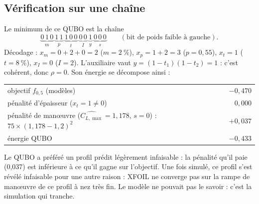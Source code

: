 \subsection{Vérification sur une chaîne}
Le minimum de ce QUBO est la chaîne
\[ \underbrace{0\,1\,0}_{m}\ \underbrace{1\,1}_{p}\ \underbrace{1\,0\,0}_{t}\ \underbrace{0\,0}_{I}\ \underbrace{1}_{y}\ \underbrace{0\,0\,0}_{s}\qquad(\text{bit de poids faible à gauche}). \]
Décodage : $x_m=0+2+0=2$ ($m=2~\%$), $x_p=1+2=3$ ($p=0{,}55$), $x_t=1$ ($t=8~\%$), $x_I=0$ ($I=2$). L'auxiliaire vaut $y=(1-t_1)(1-t_2)=1$ : c'est cohérent, donc $\rho=0$. Son énergie se décompose ainsi :
\begin{center}
\renewcommand{\arraystretch}{1.2}
\begin{tabular}{lr}
\toprule
objectif $f_{0{,}5}$ (modèles) & $-0{,}470$ \\
pénalité d'épaisseur ($x_t=1\neq0$) & $0{,}000$ \\
pénalité de manœuvre ($\widehat{C_{L,\max}}=1{,}178$, $s=0$) : $75\times(1{,}178-1{,}2)^2$ & $+0{,}037$ \\
\midrule
énergie QUBO & $-0{,}433$ \\
\bottomrule
\end{tabular}
\end{center}
Le QUBO a préféré un profil prédit légèrement infaisable : la pénalité qu'il paie (0,037) est inférieure à ce qu'il gagne sur l'objectif. Une fois simulé, ce profil s'est révélé infaisable pour une autre raison : XFOIL ne converge pas sur la rampe de manœuvre de ce profil à nez très fin. Le modèle ne pouvait pas le savoir : c'est la simulation qui tranche.


